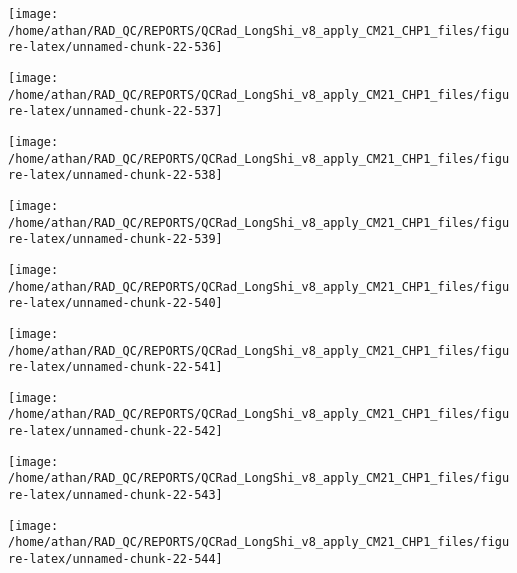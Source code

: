 \documentclass[
  10pt,
  a4paper,oneside]{article}
\begin{document}
\begin{center}\texttt{[image: /home/athan/RAD\_QC/REPORTS/QCRad\_LongShi\_v8\_apply\_CM21\_CHP1\_files/figure-latex/unnamed-chunk-22-536]} \end{center}

\begin{center}\texttt{[image: /home/athan/RAD\_QC/REPORTS/QCRad\_LongShi\_v8\_apply\_CM21\_CHP1\_files/figure-latex/unnamed-chunk-22-537]} \end{center}

\begin{center}\texttt{[image: /home/athan/RAD\_QC/REPORTS/QCRad\_LongShi\_v8\_apply\_CM21\_CHP1\_files/figure-latex/unnamed-chunk-22-538]} \end{center}

\begin{center}\texttt{[image: /home/athan/RAD\_QC/REPORTS/QCRad\_LongShi\_v8\_apply\_CM21\_CHP1\_files/figure-latex/unnamed-chunk-22-539]} \end{center}

\begin{center}\texttt{[image: /home/athan/RAD\_QC/REPORTS/QCRad\_LongShi\_v8\_apply\_CM21\_CHP1\_files/figure-latex/unnamed-chunk-22-540]} \end{center}

\begin{center}\texttt{[image: /home/athan/RAD\_QC/REPORTS/QCRad\_LongShi\_v8\_apply\_CM21\_CHP1\_files/figure-latex/unnamed-chunk-22-541]} \end{center}

\begin{center}\texttt{[image: /home/athan/RAD\_QC/REPORTS/QCRad\_LongShi\_v8\_apply\_CM21\_CHP1\_files/figure-latex/unnamed-chunk-22-542]} \end{center}

\begin{center}\texttt{[image: /home/athan/RAD\_QC/REPORTS/QCRad\_LongShi\_v8\_apply\_CM21\_CHP1\_files/figure-latex/unnamed-chunk-22-543]} \end{center}

\begin{center}\texttt{[image: /home/athan/RAD\_QC/REPORTS/QCRad\_LongShi\_v8\_apply\_CM21\_CHP1\_files/figure-latex/unnamed-chunk-22-544]} \end{center}
\end{document}
